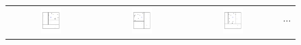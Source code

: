 \documentclass[aos]{imsart}
\theoremstyle{plain}
\theoremstyle{definition}
\theoremstyle{remark}
\begin{document}
\begin{CJK}{UTF8}{gbsn}
\begin{figure}
\begin{center}
\begin{tabular}{cccc}
\includegraphics[width = 0.25\textwidth, trim=15mm 40mm 20mm 40mm, clip = TRUE]{tree_match1.pdf} &
\includegraphics[width = 0.25\textwidth, trim=15mm 40mm 20mm 40mm, clip = TRUE]{tree_match2.pdf} &
\includegraphics[width = 0.25\textwidth, trim=15mm 40mm 20mm 40mm, clip = TRUE]{tree_match3.pdf} &
\parbox[b][0.25\textwidth][c]{0.1\textwidth}{$$\cdots$$}
\end{tabular}

\vspace{-\baselineskip}


\end{center}
\end{figure}
\end{CJK}
\end{document}
